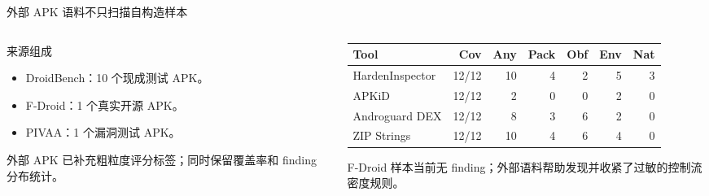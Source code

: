 \documentclass[10pt,aspectratio=169]{beamer}
\begin{document}
\begin{frame}{外部 APK 语料}{不只扫描自构造样本}
  \small
  \begin{columns}[T,totalwidth=\textwidth]
    \begin{column}{0.42\textwidth}
      \begin{block}{来源组成}
        \begin{itemize}
          \item DroidBench：10 个现成测试 APK。
          \item F-Droid：1 个真实开源 APK。
          \item PIVAA：1 个漏洞测试 APK。
        \end{itemize}
      \end{block}
      \vspace{0.35em}
      外部 APK 已补充粗粒度评分标签；同时保留覆盖率和 finding 分布统计。
    \end{column}
    \begin{column}{0.56\textwidth}
      \scriptsize
      \begin{table}
        \centering
        \begin{tabular}{lrrrrrr}
          \toprule
          Tool & Cov & Any & Pack & Obf & Env & Nat \\
          \midrule
          HardenInspector & 12/12 & 10 & 4 & 2 & 5 & 3 \\
          APKiD & 12/12 & 2 & 0 & 0 & 2 & 0 \\
          Androguard DEX & 12/12 & 8 & 3 & 6 & 2 & 0 \\
          ZIP Strings & 12/12 & 10 & 4 & 6 & 4 & 0 \\
          \bottomrule
        \end{tabular}
      \end{table}
      \vspace{0.25em}
      \scriptsize F-Droid 样本当前无 finding；外部语料帮助发现并收紧了过敏的控制流密度规则。
    \end{column}
  \end{columns}
\end{frame}
\end{document}
